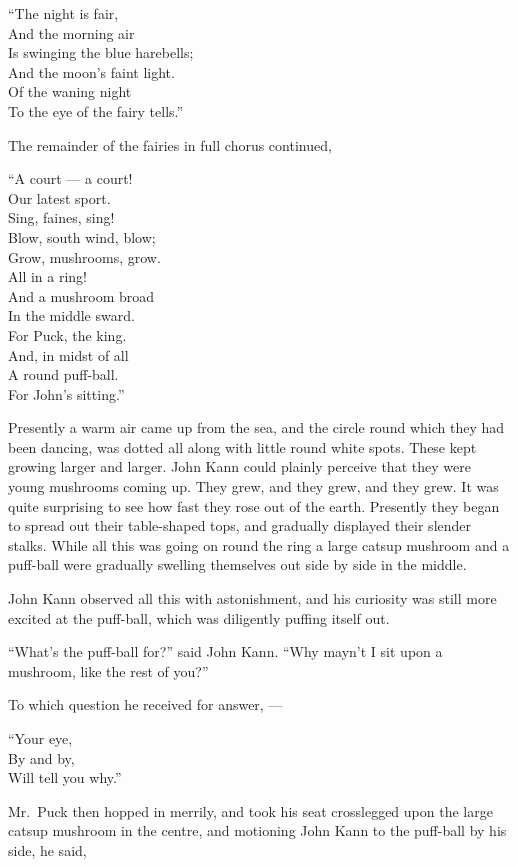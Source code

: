 \documentclass[
  12pt,
  a5paper,
  twoside]{book}
\begin{document}
``The night is fair,\\
And the morning air\\
Is swinging the blue harebells;\\
And the moon's faint light.\\
Of the waning night\\
To the eye of the fairy tells.''

The remainder of the fairies in full chorus continued,

``A court --- a court!\\
Our latest sport.\\
Sing, faines, sing!\\
Blow, south wind, blow;\\
Grow, mushrooms, grow.\\
All in a ring!\\
And a mushroom broad\\
In the middle sward.\\
For Puck, the king.\\
And, in midst of all\\
A round puff-ball.\\
For John's sitting.''

Presently a warm air came up from the sea, and the circle round which
they had been dancing, was dotted all along with little round white
spots. These kept growing larger and larger. John Kann could plainly
perceive that they were young mushrooms coming up. They grew, and they
grew, and they grew. It was quite surprising to see how fast they rose
out of the earth. Presently they began to spread out their table-shaped
tops, and gradually displayed their slender stalks. While all this was
going on round the ring a large catsup mushroom and a puff-ball were
gradually swelling themselves out side by side in the middle.

John Kann observed all this with astonishment, and his curiosity was
still more excited at the puff-ball, which was diligently puffing itself
out.

``What's the puff-ball for?'' said John Kann. ``Why mayn't I sit upon a
mushroom, like the rest of you?''

To which question he received for answer, ---

``Your eye,\\
By and by,\\
Will tell you why.''

Mr.~Puck then hopped in merrily, and took his seat crosslegged upon the
large catsup mushroom in the centre, and motioning John Kann to the
puff-ball by his side, he said,
\end{document}

